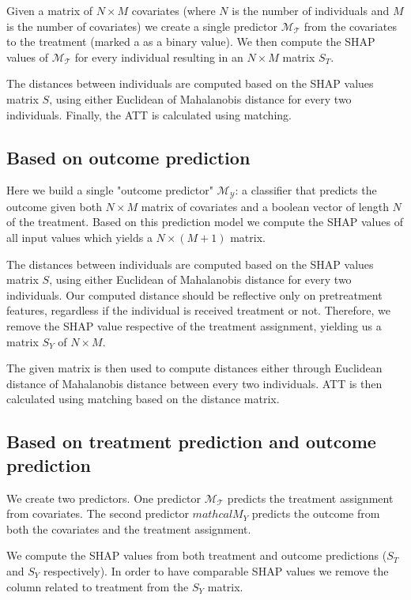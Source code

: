 \documentclass{article}
\begin{document}
Given a matrix of $N\times{}M$ covariates (where $N$ is the number of individuals and $M$ is the number of covariates) we create a single predictor $\mathcal{M_T}$ from the covariates to the treatment (marked a as a binary value). We then compute the SHAP values of $\mathcal{M_T}$ for every individual resulting in an $N\times{}M$ matrix $S_T$. 

The distances between individuals are computed based on the SHAP values matrix $S$, using either Euclidean of Mahalanobis distance for every two individuals. 
Finally, the ATT is calculated using matching. 

\subsection{Based on outcome prediction}
Here we build a single "outcome predictor" $\mathcal{M_Y}$: a classifier that predicts the outcome given both $N\times{}M$ matrix of covariates and a boolean vector of length $N$ of the treatment. 
Based on this prediction model we compute the SHAP values of all input values which yields a $N\times{}(M+1)$ matrix. 

The distances between individuals are computed based on the SHAP values matrix $S$, using either Euclidean of Mahalanobis distance for every two individuals. 
Our computed distance should be reflective only on pretreatment features, regardless if the individual is received treatment or not. Therefore, we remove the SHAP value respective of the treatment assignment, yielding us a matrix $S_Y$ of $N\times{}M$. 

The given matrix is then used to compute distances either through Euclidean distance of Mahalanobis distance between every two individuals. 
ATT is then calculated using matching based on the distance matrix. 

\subsection{Based on treatment prediction and outcome prediction}
We create two predictors. 
One predictor $\mathcal{M_T}$ predicts the treatment assignment from covariates.
The second predictor $mathcal{M}_Y$ predicts the outcome from both the covariates and the treatment assignment. 

We compute the SHAP values from both treatment and outcome predictions ($S_T$ and $S_Y$ respectively). In order to have comparable SHAP values we remove the column related to treatment from the $S_Y$ matrix. 
\end{document}
